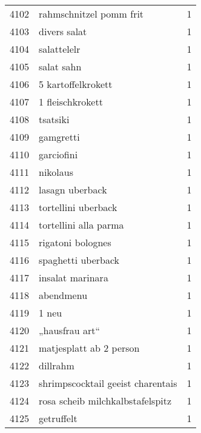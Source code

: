 \begin{tabular}{llr}
4102 &                            rahmschnitzel pomm frit &      1 \\
4103 &                                       divers salat &      1 \\
4104 &                                        salattelelr &      1 \\
4105 &                                         salat sahn &      1 \\
4106 &                                 5 kartoffelkrokett &      1 \\
4107 &                                   1 fleischkrokett &      1 \\
4108 &                                           tsatsiki &      1 \\
4109 &                                          gamgretti &      1 \\
4110 &                                         garciofini &      1 \\
4111 &                                           nikolaus &      1 \\
4112 &                                    lasagn uberback &      1 \\
4113 &                                tortellini uberback &      1 \\
4114 &                              tortellini alla parma &      1 \\
4115 &                                  rigatoni bolognes &      1 \\
4116 &                                 spaghetti uberback &      1 \\
4117 &                                   insalat marinara &      1 \\
4118 &                                          abendmenu &      1 \\
4119 &                                              1 neu &      1 \\
4120 &                                     „hausfrau art“ &      1 \\
4121 &                            matjesplatt ab 2 person &      1 \\
4122 &                                           dillrahm &      1 \\
4123 &                  shrimpscocktail geeist charentais &      1 \\
4124 &                   rosa scheib milchkalbstafelspitz &      1 \\
4125 &                                         getruffelt &      1 \\

\end{tabular}

